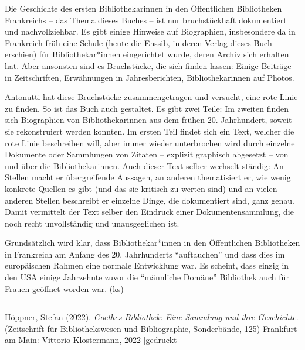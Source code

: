 \documentclass[a4paper,
fontsize=11pt,
oneside,
numbers=noperiodatend,
parskip=half-,
bibliography=totoc,
final
]{scrartcl}
\begin{document}
Die Geschichte des ersten Bibliothekarinnen in den Öffentlichen
Bibliotheken Frankreichs -- das Thema dieses Buches -- ist nur
bruchstückhaft dokumentiert und nachvollziehbar. Es gibt einige Hinweise
auf Biographien, insbesondere da in Frankreich früh eine Schule (heute
die Enssib, in deren Verlag dieses Buch erschien) für Bibliothekar*innen
eingerichtet wurde, deren Archiv sich erhalten hat. Aber ansonsten sind
es Bruchstücke, die sich finden lassen: Einige Beiträge in
Zeitschriften, Erwähnungen in Jahresberichten, Bibliothekarinnen auf
Photos.

Antonutti hat diese Bruchstücke zusammengetragen und versucht, eine rote
Linie zu finden. So ist das Buch auch gestaltet. Es gibt zwei Teile: Im
zweiten finden sich Biographien von Bibliothekarinnen aus dem frühen 20.
Jahrhundert, soweit sie rekonstruiert werden konnten. Im ersten Teil
findet sich ein Text, welcher die rote Linie beschreiben will, aber
immer wieder unterbrochen wird durch einzelne Dokumente oder Sammlungen
von Zitaten -- explizit graphisch abgesetzt -- von und über die
Bibliothekarinnen. Auch dieser Text selber wechselt ständig: An Stellen
macht er übergreifende Aussagen, an anderen thematisiert er, wie wenig
konkrete Quellen es gibt (und das sie kritisch zu werten sind) und an
vielen anderen Stellen beschreibt er einzelne Dinge, die dokumentiert
sind, ganz genau. Damit vermittelt der Text selber den Eindruck einer
Dokumentensammlung, die noch recht unvollständig und unausgeglichen ist.

Grundsätzlich wird klar, dass Bibliothekar*innen in den Öffentlichen
Bibliotheken in Frankreich am Anfang des 20. Jahrhunderts
\enquote{auftauchen} und dass dies im europäischen Rahmen eine normale
Entwicklung war. Es scheint, dass einzig in den USA einige Jahrzehnte
zuvor die \enquote{männliche Domäne} Bibliothek auch für Frauen geöffnet
worden war. (ks)

\begin{center}\rule{0.5\linewidth}{0.5pt}\end{center}

Höppner, Stefan (2022). \emph{Goethes Bibliothek: Eine Sammlung und ihre
Geschichte}. (Zeitschrift für Bibliothekswesen und Bibliographie,
Sonderbände, 125) Frankfurt am Main: Vittorio Klostermann, 2022
{[}gedruckt{]}
\end{document}
